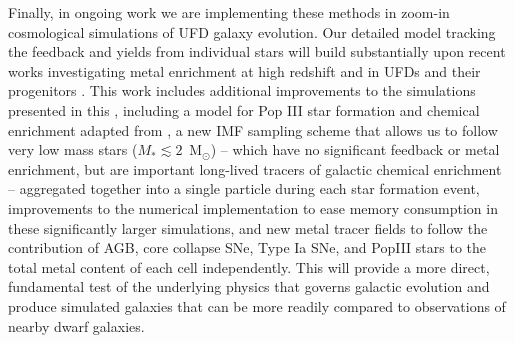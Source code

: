 Finally, in ongoing work we are implementing these methods in zoom-in cosmological simulations of UFD galaxy evolution. Our detailed model tracking the feedback and yields from individual stars will build substantially upon recent works investigating metal enrichment at high redshift and in UFDs and their progenitors \citep[e.g.][]{Ritter2015,Jeon2017,Corlies2018,Wheeler2018,Agertz2019}. This work includes additional improvements to the simulations presented in this \Dissertation, including a model for Pop III star formation and chemical enrichment adapted from \cite{Wise2012a}, a new IMF sampling scheme that allows us to follow very low mass stars ($M_* \lesssim 2$~M$_{\odot}$) -- which have no significant feedback or metal enrichment, but are important long-lived tracers of galactic chemical enrichment -- aggregated together into a single particle during each star formation event, improvements to the numerical implementation to ease memory consumption in these significantly larger simulations, and new metal tracer fields to follow the contribution of AGB, core collapse SNe, Type Ia SNe, and PopIII stars to the total metal content of each cell independently. This will provide a more direct, fundamental test of the underlying physics that governs galactic evolution and produce simulated galaxies that can be more readily compared to observations of nearby dwarf galaxies.


